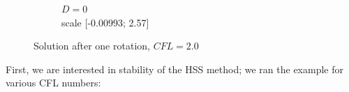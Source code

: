 \documentclass[mathserif]{beamer}
\begin{document}
\begin{frame}
\begin{figure}[H]
\begin{subfigure}[H]{0.3\textwidth}
		\vspace{-3mm}
		\caption{$D = 0$\\\vspace{-2mm}scale [-0.00993; 2.57]}
	\end{subfigure}
	\vspace{-3mm}
	\caption{Solution after one rotation, $CFL = 2.0$}	
\end{figure}

\end{frame}



\begin{frame}
First, we are interested in stability of the HSS method; we ran the example for various CFL numbers:
\begin{figure}[H]
\centering
	\begin{subfigure}[H]{0.02\textwidth}

\end{subfigure}
\end{figure}
\end{frame}
\end{document}
